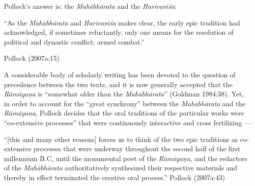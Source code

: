Pollock’s answer is: the {\sl Mahābhārata} and the {\sl Harivaṁśa}:

\begin{myquote}
“As the {\sl Mahābhārata} and {\sl Harivaṁśa} makes clear, the early epic tradition had acknowledged, if sometimes reluctantly, only one means for the resolution of political and dynastic conflict: armed combat.”

\hfill Pollock (2007a:15)
\end{myquote}

A considerable body of scholarly writing has been devoted to the question of precedence between the two texts, and it is now generally accepted that the {\sl Rāmāyaṇa} is “somewhat older than the {\sl Mahābhārata}” (Goldman 1984:38). Yet, in order to account for the “great synchrony” between the {\sl Mahābhārata} and the {\sl Rāmāyaṇa}, Pollock decides that the oral traditions of the particular works were “co-extensive processes” that were continuously interactive and cross fertilizing ---

\begin{myquote}
“[this and many other reasons] forces us to think of the two epic traditions as co-extensive processes that were underway throughout the second half of the first millennium B.C, until the monumental poet of the {\sl Rāmāyaṇa}, and the redactors of the {\sl Mahābhārata} authoritatively synthesized their respective materials and thereby in effect terminated the creative oral process.”
\hfill Pollock (2007a:43)
\end{myquote}

